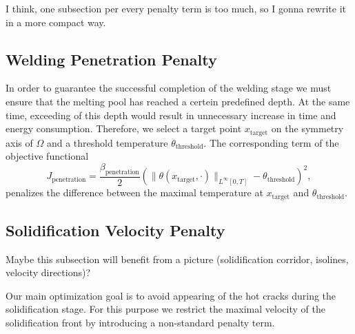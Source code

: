 {\color{TolHighContrastBlue}
I think, one subsection per every penalty term is too much, so I gonna rewrite it in a more compact way.
}

\subsection{Welding Penetration Penalty}



In order to guarantee the successful completion of the welding stage we must ensure that the melting pool has reached a certein predefined depth. At the same time, exceeding of this depth would result in unnecessary increase in time and energy consumption. Therefore, we select a target point $x_{\text{target}}$ on the symmetry axis of $\Omega$ and a threshold temperature $\theta_{\text{threshold}}$. The corresponding term of the objective functional
\begin{equation}
	J_{\text{penetration}} = \frac{\beta_\text{penetration}}{2} \left( \| \theta(x_{\text{target}},\cdot) \|_{L^{\infty}[0,T]} - \theta_{\text{threshold}} \right)^2,
\end{equation}
penalizes the difference between the maximal temperature at $x_{\text{target}}$ and $\theta_{\text{threshold}}$.


\subsection{Solidification Velocity Penalty}
\label{subsec:velocity}

{\color{TolHighContrastBlue}
Maybe this subsection will benefit from a picture (solidification corridor, isolines, velocity directions)?
}

Our main optimization goal is to avoid appearing of the hot cracks during the solidification stage. For this purpose we restrict the maximal velocity of the solidification front by introducing a non-standard penalty term.


